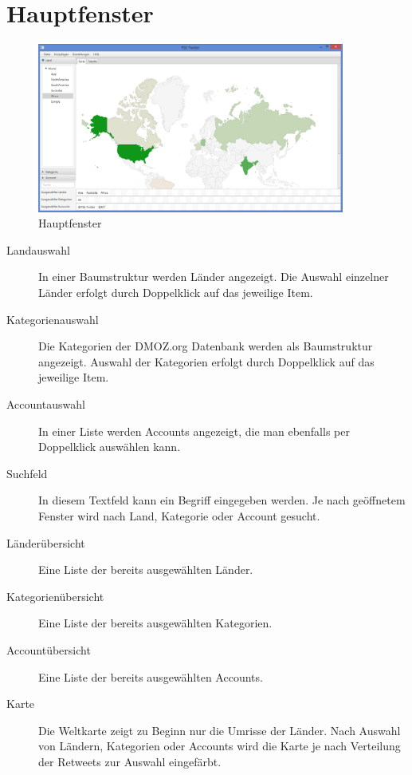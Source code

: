
\section{Hauptfenster}

\begin{figure}[h]
	\centering
	\includegraphics[width=0.9\textwidth]{img/DemoGUIMain.png}
	\caption{Hauptfenster}
	\label{c:Hauptfenster}
\end{figure}

\begin{description}
	\item[Landauswahl] In einer Baumstruktur werden Länder angezeigt. Die Auswahl einzelner Länder erfolgt durch Doppelklick auf das jeweilige Item.
	\item[Kategorienauswahl] Die Kategorien der DMOZ.org Datenbank werden als Baumstruktur angezeigt. Auswahl der Kategorien erfolgt durch Doppelklick auf das jeweilige Item.
	\item[Accountauswahl] In einer Liste werden Accounts angezeigt, die man ebenfalls per Doppelklick auswählen kann.
	\item[Suchfeld] In diesem Textfeld kann ein Begriff eingegeben werden. Je nach geöffnetem Fenster wird nach Land, Kategorie oder Account gesucht.
	\item[Länderübersicht] Eine Liste der bereits ausgewählten Länder.
	\item[Kategorienübersicht] Eine Liste der bereits ausgewählten Kategorien.
	\item[Accountübersicht] Eine Liste der bereits ausgewählten Accounts.
	\item[Karte] Die Weltkarte zeigt zu Beginn nur die Umrisse der Länder. Nach Auswahl von Ländern, Kategorien oder Accounts wird die Karte je nach Verteilung der Retweets zur Auswahl eingefärbt.	
\end{description}

